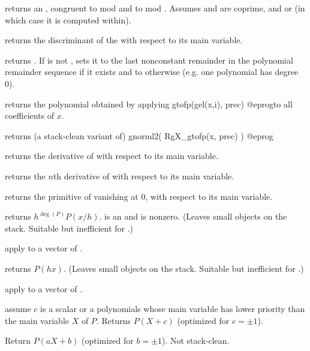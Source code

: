 returns an , congruent to  mod  and to  mod
. Assumes  and  are coprime, and 
or  (in which case it is computed within).

 returns the discriminant of the  
with respect to its main variable.

 returns
. If  is not , sets it to the last
nonconstant remainder in the polynomial remainder sequence if it exists and to
 otherwise (e.g. one polynomial has degree 0).


 returns the polynomial obtained by
applying
\bprog
  gtofp(gel(x,i), prec)
@eprog\noindent to all coefficients of $x$.

 returns (a stack-clean variant of)
\bprog
  gnorml2( RgX_gtofp(x, prec) )
@eprog

 returns the derivative of  with respect to
its main variable.

 returns the $n$th derivative of  with respect to
its main variable.

 returns the primitive of  vanishing at
$0$, with respect to its main variable.

 returns $h^{\deg(P)} P(x/h)$.
 is an  and  is nonzero. (Leaves small objects on the
stack. Suitable but inefficient for .)

 apply  to a vector
of .

 returns $P(h x)$. (Leaves small objects
on the stack. Suitable but inefficient for .)

 apply  to a vector
of .

 assume $c$ is a scalar or
a polynomials whose main variable has lower priority than the main variable
$X$ of $P$. Returns $P(X + c)$ (optimized for $c = \pm 1$).

 Return $P(aX + b)$
(optimized for $b = \pm 1$). Not stack-clean.

